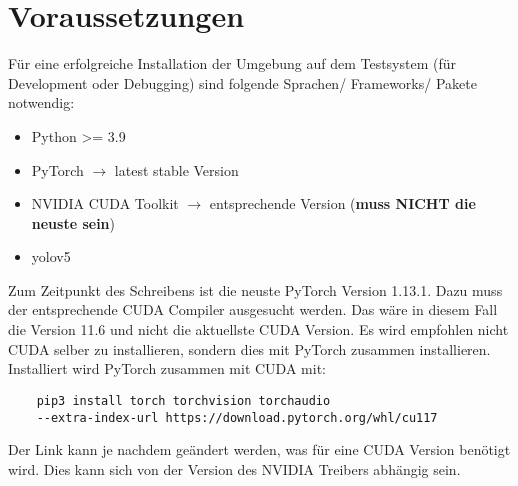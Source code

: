 \chapter{Voraussetzungen}

Für eine erfolgreiche Installation der Umgebung auf dem Testsystem (für Development oder Debugging) sind folgende Sprachen/ Frameworks/ Pakete notwendig:
\begin{itemize}
    \item Python >= 3.9
    \item PyTorch $\rightarrow$ latest stable Version
    \item NVIDIA CUDA Toolkit $\rightarrow$ entsprechende Version (\textbf{muss NICHT die neuste sein})
    \item \ac{yolo}v5
\end{itemize}

Zum Zeitpunkt des Schreibens ist die neuste PyTorch Version 1.13.1. Dazu muss der entsprechende CUDA Compiler ausgesucht werden. Das wäre in diesem Fall die Version 11.6 und nicht die aktuellste CUDA Version. Es wird empfohlen nicht CUDA selber zu installieren, sondern dies mit PyTorch zusammen installieren. Installiert wird PyTorch zusammen mit CUDA mit:
\begin{verbatim}
    pip3 install torch torchvision torchaudio 
    --extra-index-url https://download.pytorch.org/whl/cu117
\end{verbatim}
Der Link kann je nachdem geändert werden, was für eine CUDA Version benötigt wird. Dies kann sich von der Version des NVIDIA Treibers abhängig sein.